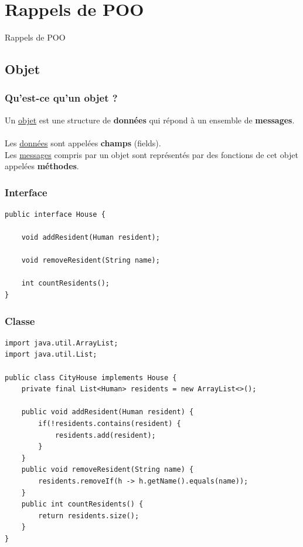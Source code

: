 \section{Rappels de POO}

\begin{frame}
    \begin{center}
    \fontsize{48pt}{7.2}\selectfont
    Rappels de POO
    \end{center}
\end{frame}

\subsection{Objet}
\begin{frame}
\frametitle{Qu'est-ce qu'un objet ?}
Un \underline{objet} est une structure de \textbf{donn\'{e}es} qui r\'{e}pond \`{a} un ensemble de \textbf{messages}.
\\~\\
Les \underline{donn\'{e}es} sont appel\'{e}es \textbf{champs} (fields).
\\
Les \underline{messages} compris par un objet sont repr\'{e}sent\'{e}s par des fonctions de cet objet appel\'{e}es \textbf{m\'{e}thodes}.
\end{frame}

\begin{frame}[fragile]
\frametitle{Interface}
\begin{lstlisting}
public interface House {

	void addResident(Human resident);

	void removeResident(String name);

	int countResidents();
}
	\end{lstlisting}
\end{frame}

\begin{frame}[fragile]
\frametitle{Classe}
\begin{lstlisting}
import java.util.ArrayList;
import java.util.List;

public class CityHouse implements House {
	private final List<Human> residents = new ArrayList<>();

	public void addResident(Human resident) {
		if(!residents.contains(resident) {
			residents.add(resident);
		}
	}
	public void removeResident(String name) {
		residents.removeIf(h -> h.getName().equals(name));
	}
	public int countResidents() {
    	return residents.size();
    }
}
	\end{lstlisting}
\end{frame}

